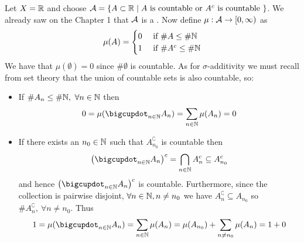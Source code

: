 \begin{eg}
	Let $X = \mathbb{R}$ and choose $\mathcal{A} = \{A \subset \mathbb{R} \mid A\text{ is countable or } A^c \text{ is countable }\}$. We already saw on the Chapter 1 that $\mathcal{A}$ is a \siga. Now define $\mu:\mathcal{A} \to [0, \infty)$ as
	\begin{align}
		\mu(A) = \begin{cases}
		0 &\text{ if } \# A \leq \# \mathbb{N} \\
		1 &\text{ if } \# A^c \leq \# \mathbb{N}
		\end{cases}
	\end{align}
	We have that $\mu(\emptyset) = 0$ since $\#\emptyset$ is countable. As for $\sigma$-additivity we must recall from set theory that the union of countable sets is also countable, so:
	\begin{itemize}
		\item If $\#A_n \leq \#\mathbb{N},\ \forall n \in \mathbb{N}$ then
		\begin{align*}
			0 = \mu(\bigcupdot_{n \in \N} A_n) = \sum_{n\in \N} \mu(A_n) = 0
		\end{align*} 
		\item If there exists an $n_0 \in \mathbb{N}$ such that $A_{n_0}^\complement$ is countable then
		\begin{align*}
			\left(\bigcupdot_{n \in \N} A_n\right)^\complement = \bigcap_{n \in \N} A_n^\complement \subseteq A_{n_0}^\complement
		\end{align*}
		and hence $\left(\bigcupdot_{n \in \N} A_n\right)^\complement$ is countable. Furthermore, since the collection is pairwise disjoint, $\forall n \in \mathbb{N}, n \neq n_0$ we have $A_n^\complement \subseteq A_{n_0}$ so $\#A_n^\complement,\ \forall n \neq n_0$. Thus
		\begin{align*}
			1 = \mu(\bigcupdot_{n \in \N} A_n) = \sum_{n\in\N} \mu(A_n) = \mu(A_{n_0}) + \sum_{n \neq n_0} \mu(A_n) = 1 + 0
		\end{align*}
	\end{itemize}
\end{eg}

